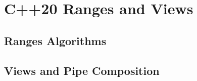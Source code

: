 \section{C++20 Ranges and Views}\label{sec:ranges}

\subsection{Ranges Algorithms}

\subsection{Views and Pipe Composition}
